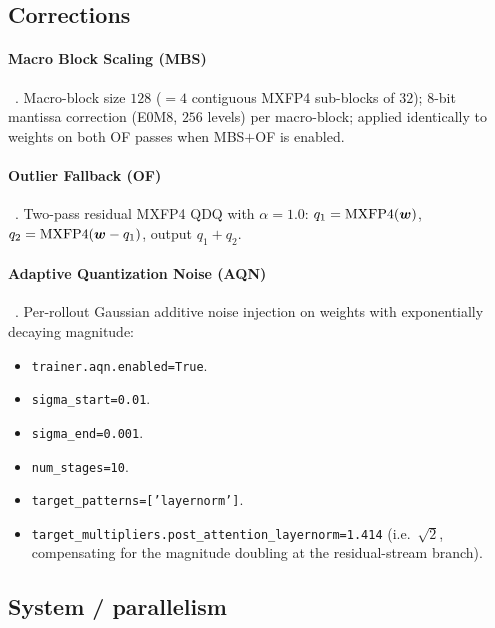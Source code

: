 \subsection*{Corrections}

\paragraph{Macro Block Scaling (MBS)}~\citep{chhugani2026mxfp4}.
Macro-block size $128$ ($= 4$ contiguous MXFP4 sub-blocks of $32$);
$8$-bit mantissa correction (E0M8, $256$ levels) per macro-block;
applied identically to weights on both OF passes when MBS$+$OF is
enabled.

\paragraph{Outlier Fallback (OF)}~\citep{zhang2025fallback}.
Two-pass residual MXFP4 QDQ with $\alpha = 1.0$:
$q_1 = \mathrm{MXFP4}(\bm{w})$,
$q_2 = \mathrm{MXFP4}(\bm{w} - q_1)$,
output $q_1 + q_2$.

\paragraph{Adaptive Quantization Noise (AQN)} ~\cite{huang2025qerl}.
Per-rollout Gaussian additive noise injection on weights with
exponentially decaying magnitude:
\begin{itemize}\setlength{\itemsep}{1pt}
  \item \texttt{trainer.aqn.enabled=True}.
  \item \texttt{sigma\_start=0.01}.
  \item \texttt{sigma\_end=0.001}.
  \item \texttt{num\_stages=10}.
  \item \texttt{target\_patterns=['layernorm']}.
  \item \texttt{target\_multipliers.post\_attention\_layernorm=1.414}
        (i.e.\ $\sqrt{2}$, compensating for the magnitude doubling at
        the residual-stream branch).
\end{itemize}

\subsection*{System / parallelism}

